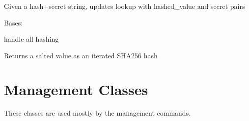 \documentclass[letterpaper,10pt,english]{sphinxmanual}
\begin{document}
\begin{fulllineitems}
\begin{fulllineitems}
\end{fulllineitems}


\begin{fulllineitems}
\label{base_classes:bhp_crypto.classes.FieldCryptor.update_secret_in_lookup}
Given a hash+secret string, updates lookup with hashed\_value and secret pairs

\end{fulllineitems}


\end{fulllineitems}


\begin{fulllineitems}
\label{base_classes:bhp_crypto.classes.Hasher}
Bases: 

handle all hashing

\begin{fulllineitems}
\label{base_classes:bhp_crypto.classes.Hasher.get_hash}
Returns a salted value as an iterated SHA256 hash

\end{fulllineitems}


\end{fulllineitems}

\label{base_classes:module-bhp_crypto.fields}

\chapter{Management Classes}
\label{base_classes:management-classes}
These classes are used mostly by the management commands.
\end{document}
